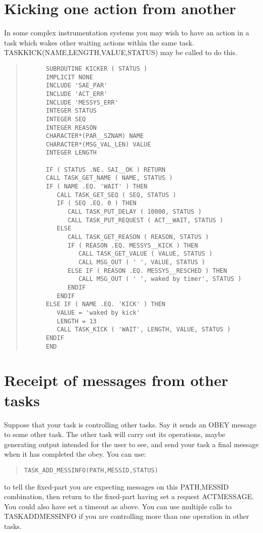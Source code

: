 \documentclass[twoside,11pt]{article}
\newcommand{\xlabel}[1]{}
\renewcommand{\_}{\texttt{\symbol{95}}}
\begin{document}
\section{Kicking one action from another
\xlabel{kicking_one_action_from_another}}

In some complex instrumentation systems you may wish to have an action in a
task which wakes other waiting actions within the same task.
TASK\_KICK(NAME,LENGTH,VALUE,STATUS) may be called to do this.

\small \begin{quote} \begin{verbatim}
      SUBROUTINE KICKER ( STATUS )
      IMPLICIT NONE
      INCLUDE 'SAE_PAR'
      INCLUDE 'ACT_ERR'
      INCLUDE 'MESSYS_ERR'
      INTEGER STATUS
      INTEGER SEQ
      INTEGER REASON
      CHARACTER*(PAR__SZNAM) NAME
      CHARACTER*(MSG_VAL_LEN) VALUE
      INTEGER LENGTH

      IF ( STATUS .NE. SAI__OK ) RETURN
      CALL TASK_GET_NAME ( NAME, STATUS )
      IF ( NAME .EQ. 'WAIT' ) THEN
         CALL TASK_GET_SEQ ( SEQ, STATUS )
         IF ( SEQ .EQ. 0 ) THEN
            CALL TASK_PUT_DELAY ( 10000, STATUS )
            CALL TASK_PUT_REQUEST ( ACT__WAIT, STATUS )
         ELSE
            CALL TASK_GET_REASON ( REASON, STATUS )
            IF ( REASON .EQ. MESSYS__KICK ) THEN
               CALL TASK_GET_VALUE ( VALUE, STATUS )
               CALL MSG_OUT ( ' ', VALUE, STATUS )
            ELSE IF ( REASON .EQ. MESSYS__RESCHED ) THEN
               CALL MSG_OUT ( ' ', waked by timer', STATUS )
            ENDIF
         ENDIF
      ELSE IF ( NAME .EQ. 'KICK' ) THEN
         VALUE = 'waked by kick'
         LENGTH = 13
         CALL TASK_KICK ( 'WAIT', LENGTH, VALUE, STATUS )
      ENDIF
      END
\end{verbatim} \end{quote} \normalsize

\section{Receipt of messages from other tasks
\xlabel{receipt_of_messages_from_other_tasks}}

Suppose that your task is controlling other tasks. Say it sends an OBEY
message to some other task. The other task will carry out its
operations, maybe generating output intended for the user to see, and
send your task a final message when it has completed the obey. You can
use: 
\small \begin{quote} \begin{verbatim}
TASK_ADD_MESSINFO(PATH,MESSID,STATUS)
\end{verbatim} \end{quote} \normalsize
to tell the fixed-part you are 
expecting messages on this PATH,MESSID combination, then return to the 
fixed-part having set a request ACT\_\_MESSAGE. You could also have set a 
timeout as above. You can use multiple calls to TASK\_ADD\_MESSINFO if you 
are controlling more than one operation in other tasks.
\end{document}
